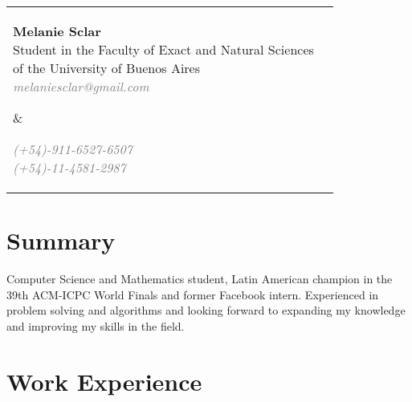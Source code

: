 \documentclass [a4paper, 11pt]{article}
\begin{document}
\noindent \begin{tabularx}{\textwidth}{X r}
  \hspace{-15pt}\parbox[t]{15cm}{
  \hspace{-2pt}\textbf{\huge{Melanie Sclar}} \\
  Student in the Faculty of Exact and Natural Sciences \\
  of the University of Buenos Aires \\
  \emph{ \textcolor{gray}{melaniesclar@gmail.com} }
  } &

\parbox[t]{3.8cm}{ \emph{\textcolor{gray}{
  (+54)-911-6527-6507 \\
  (+54)-11-4581-2987 }}
  
}
\end{tabularx}

\sectionfont{\sectionrule{0pt}{0pt}{-.2cm}{1pt}}
\section* {Summary}
Computer Science and Mathematics student, Latin American champion in the 39th ACM-ICPC World Finals and former Facebook intern. Experienced in problem solving and algorithms and looking forward to expanding my knowledge and improving my skills in the field.

\section* {Work Experience}
\end{document}
